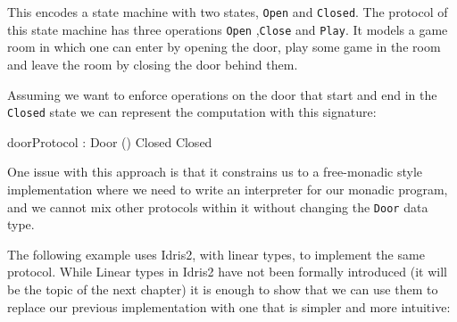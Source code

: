 \documentclass[
]{article}
\newenvironment{Shaded}{}{}
\newcommand{\DataTypeTok}[1]{\textcolor[rgb]{0.56,0.13,0.00}{#1}}
\newcommand{\NormalTok}[1]{#1}
\newcommand{\OperatorTok}[1]{\textcolor[rgb]{0.40,0.40,0.40}{#1}}
\begin{document}
This encodes a state machine with two states, \texttt{Open} and
\texttt{Closed}. The protocol of this state machine has three operations
\texttt{Open} ,\texttt{Close} and \texttt{Play}. It models a game room
in which one can enter by opening the door, play some game in the room
and leave the room by closing the door behind them.

Assuming we want to enforce operations on the door that start and end in
the \texttt{Closed} state we can represent the computation with this
signature:

\begin{Shaded}
\begin{Highlighting}[]
\NormalTok{doorProtocol }\OperatorTok{:} \DataTypeTok{Door}\NormalTok{ () }\DataTypeTok{Closed} \DataTypeTok{Closed}
\end{Highlighting}
\end{Shaded}

One issue with this approach is that it constrains us to a free-monadic
style implementation where we need to write an interpreter for our
monadic program, and we cannot mix other protocols within it without
changing the \texttt{Door} data type.

The following example uses Idris2, with linear types, to implement the
same protocol. While Linear types in Idris2 have not been formally
introduced (it will be the topic of the next chapter) it is enough to
show that we can use them to replace our previous implementation with
one that is simpler and more intuitive:
\end{document}
